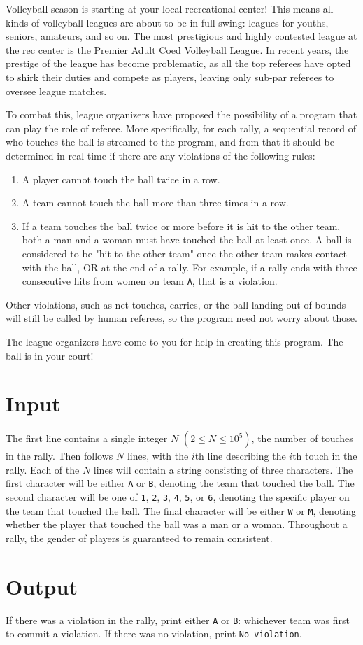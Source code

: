 
Volleyball season is starting at your local recreational center! This means all kinds of volleyball
leagues are about to be in full swing: leagues for youths, seniors, amateurs, and so on. The most
prestigious and highly contested league at the rec center is the Premier Adult Coed Volleyball
League. In recent years, the prestige of the league has become problematic, as all the top referees
have opted to shirk their duties and compete as players, leaving only sub-par referees to oversee
league matches.

To combat this, league organizers have proposed the possibility of a program that can play the role of
referee. More specifically, for each rally, a sequential record of who touches the ball is streamed to
the program, and from that it should be determined in real-time if there are any violations of the
following rules:

\begin{enumerate}
    \item A player cannot touch the ball twice in a row.
    \item A team cannot touch the ball more than three times in a row.
    \item If a team touches the ball twice or more before it is hit to the other team, both a man
    and a woman must have touched the ball at least once. A ball is considered to be "hit to the other team"
    once the other team makes contact with the ball, OR at the end of a rally. For example, if a rally ends
    with three consecutive hits from women on team \texttt{A}, that is a violation.
\end{enumerate}

Other violations, such as net touches, carries, or the ball landing out of bounds will still be called
by human referees, so the program need not worry about those.

The league organizers have come to you for help in creating this program. The ball is in your court!

\section*{Input}

The first line contains a single integer $N$ $(2 \leq N \leq 10^5)$, the number of touches in the rally. 
Then follows $N$ lines, with the $i$th line describing the $i$th touch in the rally. Each of the $N$ lines
will contain a string consisting of three characters. The first character will be either \texttt{A} or
\texttt{B}, denoting the team that touched the ball. The second character will be one of \texttt{1},
\texttt{2}, \texttt{3}, \texttt{4}, \texttt{5}, or \texttt{6}, denoting the specific player on the team that
touched the ball. The final character will be either \texttt{W} or \texttt{M}, denoting whether the player
that touched the ball was a man or a woman. Throughout a rally, the gender of players is guaranteed to
remain consistent.

\section*{Output}

If there was a violation in the rally, print either \texttt{A} or \texttt{B}: whichever team was first to
commit a violation. If there was no violation, print \texttt{No violation}.

